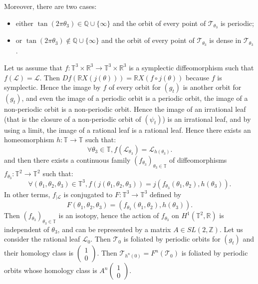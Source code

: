 \documentclass{dcds}
\theoremstyle{definition}
\begin{document}
Moreover, there are two cases:
\begin{itemize}
\item either $\tan(2\pi\theta_3)\in{\mathbb {Q}}\cup\{ \infty\}$ and the orbit of every point of ${\mathcal {T}}_{\theta_3}$ is periodic;
\item or  $\tan(2\pi\theta_3)\notin{\mathbb {Q}}\cup\{ \infty\}$ and the orbit of every point of ${\mathcal {T}}_{\theta_3}$ is dense in ${\mathcal {T}}_{\theta_3}$.
\end{itemize}
Let us assume that $f:{\mathbb {T}}^3\times{\mathbb {R}}^3\rightarrow {\mathbb {T}}^3\times {\mathbb {R}}^3$ is a symplectic  diffeomorphism such that $f({\mathcal {L}})={\mathcal {L}}$. Then $Df({\mathbb {R}} X (j(\theta)))={\mathbb {R}} X(f\circ j(\theta))$ because $f$ is symplectic. Hence the image by $f$ of every orbit for $(g_t)$ is another orbit for $(g_t)$, and even the image of a periodic orbit is a periodic orbit, the image of a non-periodic orbit is a non-periodic orbit. Hence the image of an irrational leaf (that is the closure of a non-periodic orbit of $(\psi_t)$) is  an irrational leaf, and by using a limit,  the image of a rational leaf is a rational leaf. Hence there exists an homeomorphism $h:{\mathbb {T}}\rightarrow {\mathbb {T}}$ such that:
$$\forall \theta_3\in{\mathbb {T}}, f({\mathcal {L}}_{\theta_3})={\mathcal {L}}_{h(\theta_3)}.$$
and then there exists a continuous   family $(f_{\theta_3})_{\theta_3\in{\mathbb {T}}}$ of diffeomorphisms $ f_{\theta_3}:{\mathbb {T}}^2\rightarrow{\mathbb {T}}^2$ such that:
$$\forall (\theta_1, \theta_2, \theta_3)\in{\mathbb {T}}^3, f(j(\theta_1, \theta_2, \theta_3))=j(f_{\theta_3}(\theta_1, \theta_2), h(\theta_3)).$$
In other terms, $f_{|{\mathcal {L}}}$ is conjugated to $F:{\mathbb {T}}^3\rightarrow {\mathbb {T}}^3$ defined by $$F(\theta_1, \theta_2, \theta_3)= (f_{\theta_3}(\theta_1, \theta_2), h(\theta_3)).$$Then $(f_{\theta_3})_{\theta_3\in{\mathbb {T}}}$ is an isotopy, hence the action of $f_{\theta_3}$ on $H^1({\mathbb {T}}^2, {\mathbb {R}})$ is independent of $\theta_3$, and can be represented by a matrix $A\in SL(2, {\mathbb {Z}})$. Let us consider the rational leaf ${\mathcal {L}}_0$. Then ${\mathcal {T}}_0$ is foliated by periodic orbits for $(g_t)$ and their homology class is $\begin{pmatrix} 1\\0\end{pmatrix}$. Then ${\mathcal {T}}_{h^n(0)}=F^n({\mathcal {T}}_0)$ is foliated by periodic orbits whose homology class is $A^n\begin{pmatrix} 1\\0\end{pmatrix}$.
\end{document}
